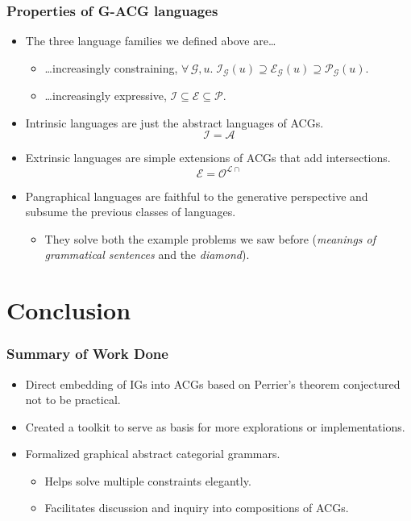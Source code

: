 \documentclass{beamer}
\begin{document}
\begin{frame}
  \frametitle{Properties of G-ACG languages}

  \begin{itemize}
  \item The three language families we defined above are\ldots
    \begin{itemize}
    \item {\ldots}increasingly constraining, $\forall \, \mathcal{G},
      u. \; \mathcal{I}_{\mathcal{G}}(u) \supseteq
      \mathcal{E}_{\mathcal{G}}(u) \supseteq
      \mathcal{P}_{\mathcal{G}}(u)$.
    \item {\ldots}increasingly expressive, $\mathcal{I} \subseteq
      \mathcal{E} \subseteq \mathcal{P}$.
    \end{itemize}
  \vfill
  \item Intrinsic languages are just the abstract languages of ACGs.
    $$\mathcal{I} = \mathcal{A}$$
  \vfill
  \item Extrinsic languages are simple extensions of ACGs that add
    intersections.
    $$\mathcal{E} = \mathcal{O}^{\mathcal{L}{\cap}}$$
  \vfill
  \item Pangraphical languages are faithful to the generative
    perspective and subsume the previous classes of languages.
    \begin{itemize}
    \item They solve both the example problems we saw before
      (\emph{meanings of grammatical sentences} and the \emph{diamond}).
    \end{itemize}
  \end{itemize}
\end{frame}


\section{Conclusion}

\begin{frame}
  \frametitle{Summary of Work Done}

  \begin{itemize}
  \item Direct embedding of IGs into ACGs based on Perrier's theorem
    conjectured not to be practical.
  \vfill
  \item Created a toolkit to serve as basis for more explorations or
    implementations.
  \vfill
  \item Formalized graphical abstract categorial grammars.
    \begin{itemize}
    \item Helps solve multiple constraints elegantly.
    \item Facilitates discussion and inquiry into compositions of ACGs.
    \end{itemize}
  \end{itemize}
\end{frame}
\end{document}
